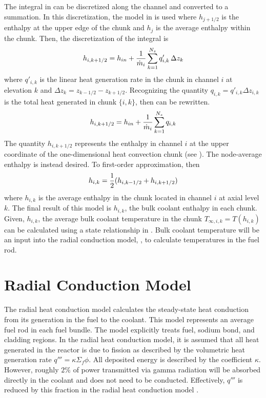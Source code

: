     The integral in  can be discretized along
    the channel and converted to a summation. In this discretization, the model
    in  is used where $h_{j+1/2}$ is the enthalpy at the
    upper edge of the chunk and $h_j$ is the average enthalpy within the chunk.
    Then, the discretization of the integral 
    is 
    \begin{equation}
      \label{eq:heat_balance}
      h_{i,k+1/2} = 
        h_{in} + \frac{1}{\dot{m}_i} \sum_{k=1}^{N_z} q'_{i,k} \, \Delta z_{k}
    \end{equation}
    where $q'_{i,k}$ is the linear heat generation rate in the chunk in channel
    $i$ at elevation $k$ and ${\Delta z_{k} = z_{k-1/2} - z_{k+1/2}}$. 
    Recognizing the quantity $q_{i,k} = q'_{i,k} \Delta z_{i,k}$
    is the total heat generated in chunk $\{i,k\}$, then  
    can be rewritten.
    \begin{equation}
      h_{i,k+1/2} = h_{in} + \frac{1}{\dot{m}_i} \sum_{k=1}^{N_z} q_{i,k}
    \end{equation}
    The quantity $h_{i,k+1/2}$ represents the enthalpy in channel $i$ at the 
    upper coordinate of the one-dimensional heat convection chunk (see
    ). The node-average enthalpy is instead desired. To 
    first-order approximation, then
    \begin{equation}
      h_{i,k} = \frac{1}{2} (h_{i,k-1/2}+h_{i,k+1/2})
    \end{equation}
    where $h_{i,k}$ is the average enthalpy in the chunk located in channel $i$
    at axial level $k$. The final result of this model is $h_{i,k}$, the bulk 
    coolant enthalpy in each chunk. Given, $h_{i,k}$, the average bulk coolant 
    temperature in the chunk $T_{\infty,i,k} = T(h_{i,k})$ can be calculated 
    using a state relationship in \cite{sodiumProp}. Bulk coolant temperature 
    will be an input into the radial conduction model, 
    , to calculate temperatures in the fuel 
    rod.
  
\section{Radial Conduction Model}
  \label{sec:radial_conduction_model}
  The radial heat conduction model calculates the steady-state heat
  conduction from its generation in the fuel to the coolant. This model
  represents an average fuel rod in each fuel bundle. The model explicitly
  treats fuel, sodium bond, and cladding regions.
  In the radial heat conduction model, it is assumed that all heat generated in
  the reactor is due to fission as described by the volumetric heat
  generation rate ${q'''=\kappa \Sigma_f \phi}$. All deposited energy is
  described by the coefficient $\kappa$. However, roughly $2\%$ of power
  transmitted via gamma radiation will be absorbed directly in the coolant and
  does not need to be conducted. Effectively, $q'''$ is reduced by this fraction
  in the radial heat conduction model \cite{FastSpectrumReactors}.
  
